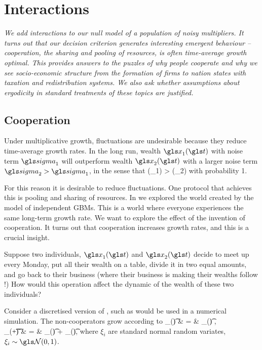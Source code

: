

\section{Interactions}
{\it
We add interactions to our null model of a population of noisy multipliers. It turns out that our decision criterion generates interesting emergent behaviour -- cooperation, the sharing and pooling of resources, is often time-average 
growth optimal. This provides answers to the puzzles of why people cooperate and why we see socio-economic structure from the formation of firms to nation states with taxation and redistribution systems. We also ask whether assumptions about ergodicity in standard treatments of these topics are justified.}
\newpage



\subsection{Cooperation}
Under multiplicative growth, fluctuations are undesirable because they reduce 
time-average growth rates. In the long run, wealth $\x_1(\t)$ with noise term 
$\gsigma_1$ will outperform wealth $\x_2(\t)$ with a larger 
noise term $\gsigma_2>\gsigma_1$, in the sense that 
\be
\gt(\x_1) > \gt(\x_2)
\ee
with probability 1.

For this reason it is desirable to reduce fluctuations. One protocol that achieves this is pooling and sharing of resources. In  we explored the world created 
by the model of independent GBMs. This is a world where everyone experiences the 
same long-term growth rate. We want to explore the effect of the invention of 
cooperation. It turns out that cooperation increases growth rates, and this is a 
crucial insight. 

Suppose two individuals, $\x_1(\t)$ and $\x_2(\t)$ decide to meet up every Monday, put all their wealth on a table, divide it in two equal amounts, and go back to their business (where their business is making their wealths follow \GBM!) How 
would this operation affect the dynamic of the wealth of these two individuals?

Consider a discretised version of , such as would be used in a numerical simulation. The non-cooperators grow according to
 \bea
 \D \x_\gi(\t) & = & \x_\gi(\t) ,  \\
 \x_\gi(\t+\D\t) & = & \x_\gi(\t) + \D \x_\gi(\t), 
 \eea
 where $\xi_i$ are standard normal random variates, $\xi_i\sim \mathcal{\N}(0,1)$.

